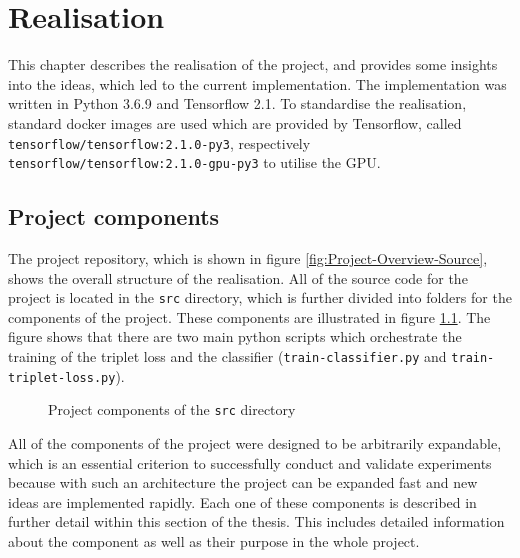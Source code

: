 \chapter{Realisation}
\label{ch:Realisation}
This chapter describes the realisation of the project, and provides some insights into the ideas, which led to the current implementation. The implementation was written in Python 3.6.9 and Tensorflow 2.1. To standardise the realisation, standard docker images are used which are provided by Tensorflow, called \texttt{tensorflow/tensorflow:2.1.0-py3}, respectively \texttt{tensorflow/tensorflow:2.1.0-gpu-py3} to utilise the GPU.

\section{Project components}
\label{sec:Project-Components}
The project repository, which is shown in figure \ref{fig:Project-Overview-Source}, shows the overall structure of the realisation. All of the source code for the project is located in the \texttt{src} directory, which is further divided into folders for the components of the project. These components are illustrated in figure \ref{sec:Project-Components}. The figure shows that there are two main python scripts which orchestrate the training of the triplet loss and the classifier (\texttt{train-classifier.py} and \texttt{train-triplet-loss.py}). 

\begin{figure}[ht]
\caption{Project components of the \texttt{src} directory}
\label{fig:Project-Components}
\end{figure}
\noindent
All of the components of the project were designed to be arbitrarily expandable, which is an essential criterion to successfully conduct and validate experiments because with such an architecture the project can be expanded fast and new ideas are implemented rapidly.
\newline
\newline
Each one of these components is described in further detail within this section of the thesis. This includes detailed information about the component as well as their purpose in the whole project.

